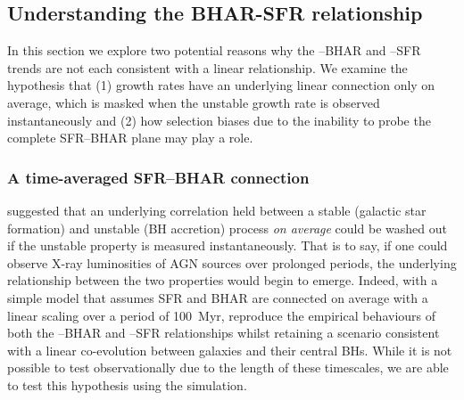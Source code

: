 \subsection{Understanding the BHAR-SFR relationship} \label{sect:understanding}

In this section we explore two potential reasons why the --BHAR and
--SFR trends are not each consistent with a linear relationship. We
examine the hypothesis that (1) growth rates have an underlying linear
connection only on average, which is masked when the unstable growth rate is
observed instantaneously and (2) how selection biases due to the inability to
probe the complete SFR--BHAR plane may play a role.  

\subsubsection{A time-averaged SFR--BHAR connection}
\label{sect:time_av}

\citet{Hickox2014} suggested that an underlying correlation held between a
stable (galactic star formation) and unstable (BH accretion) process \textit{on
average} could be washed out if the unstable property is measured
instantaneously.  That is to say, if one could observe X-ray luminosities of
AGN sources over prolonged periods, the underlying relationship between the two
properties would begin to emerge.  Indeed, with a simple model that assumes SFR
and BHAR are connected on average with a linear scaling over a period of
100~Myr, \citet{Hickox2014} reproduce the empirical behaviours of both the
--BHAR and --SFR relationships whilst retaining a scenario
consistent with a linear co-evolution between galaxies and their central BHs.
While it is not possible to test observationally due to the length of these
timescales, we are able to test this hypothesis using the simulation.

